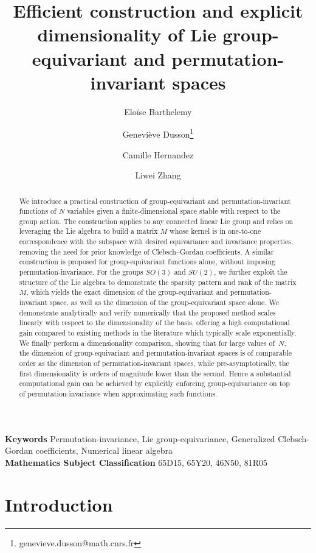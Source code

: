 \documentclass{article}
\title{Efficient construction and explicit dimensionality of Lie group-equivariant and permutation-invariant spaces}
\author[1]{Eloïse Barthelemy}
\affil[1]{Université Marie et Louis Pasteur, CNRS, LmB (UMR 6623), F-25000 Besançon, France}
\author[1]{Genevi\`eve Dusson\footnote{genevieve.dusson@math.cnrs.fr}}
\author[1]{Camille Hernandez}
\author[2]{Liwei Zhang}
\affil[2]{Institut f\"ur Geometrie und Praktische Mathematik, RWTH Aachen University, Im Süsterfeld 2, 52072 Aachen, Germany }
\date{}
\numberwithin{equation}{section}
\def\Nat{{N}}
\begin{document}
\maketitle

\begin{abstract}
We introduce a practical construction of group-equivariant and 
permutation-invariant functions of $\Nat$ variables 
given a finite-dimensional space stable with respect to the group action.
The construction applies to any connected linear Lie group
and relies on leveraging the Lie algebra to build a matrix $M$
whose kernel is in one-to-one correspondence with the subspace with desired equivariance and invariance properties, removing the need for prior knowledge of Clebsch--Gordan coefficients. 
A similar construction is proposed for group-equivariant functions alone, without imposing permutation-invariance.
For the groups $SO(3)$ and $SU(2)$, we further exploit the structure of the Lie algebra to demonstrate the sparsity pattern and rank of the matrix $M$, which yields the exact dimension of the group-equivariant and permutation-invariant space, as well as the dimension of the group-equivariant space alone.
We demonstrate analytically and verify numerically that the proposed method scales linearly with respect to the dimensionality of the basis, 
offering a high computational gain compared to existing methods in the literature which typically scale exponentially.
We finally perform a dimensionality comparison, showing that for large values of~$\Nat$, the dimension of group-equivariant and permutation-invariant spaces is of comparable order as the dimension of permutation-invariant spaces, while pre-asymptotically,
the first dimensionality is orders of magnitude lower than the second. Hence a substantial computational gain can be achieved by explicitly enforcing group-equivariance on top of permutation-invariance when approximating such functions.
\end{abstract}

\vspace{1em}
\noindent\textbf{Keywords} Permutation-invariance,  Lie group-equivariance, Generalized Clebsch-Gordan coefficients, Numerical linear algebra
\\

\noindent\textbf{Mathematics Subject Classification} 65D15, 65Y20, 46N50, 81R05

\tableofcontents



\section{Introduction}
\end{document}
